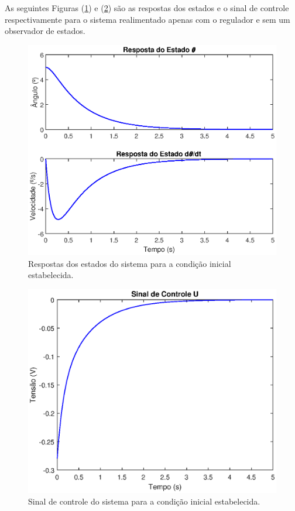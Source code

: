 As seguintes Figuras (\ref{fig:RespostaEstados-LQR}) e (\ref{fig:SinalControle-LQR}) são as respostas dos estados e o sinal de controle respectivamente para o sistema realimentado apenas com o regulador e sem um observador de estados.
\begin{figure}[H]
    \centering
    \includegraphics[scale=0.75]{ProjControladores/lqr_estados.eps}
    \caption{Respostas dos estados do sistema para a condição inicial estabelecida.}
    \label{fig:RespostaEstados-LQR}
\end{figure}{}
\begin{figure}[H]
    \centering
    \includegraphics[scale=0.75]{ProjControladores/lqr_sinal_controle.eps}
    \caption{Sinal de controle do sistema para a condição inicial estabelecida.}
    \label{fig:SinalControle-LQR}
\end{figure}{}


